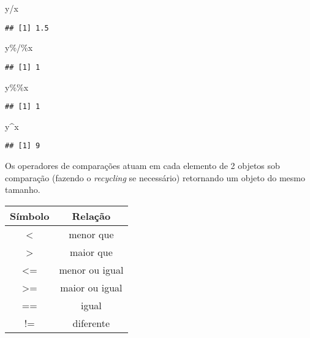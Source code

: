 \documentclass[
]{book}
\newenvironment{Shaded}{\begin{snugshade}}{\end{snugshade}}
\newcommand{\NormalTok}[1]{#1}
\newcommand{\SpecialCharTok}[1]{\textcolor[rgb]{0.00,0.00,0.00}{#1}}
\begin{document}
\begin{Shaded}
\begin{Highlighting}[]
\NormalTok{y}\SpecialCharTok{/}\NormalTok{x}
\end{Highlighting}
\end{Shaded}

\begin{verbatim}
## [1] 1.5
\end{verbatim}

\begin{Shaded}
\begin{Highlighting}[]
\NormalTok{y}\SpecialCharTok{\%/\%}\NormalTok{x}
\end{Highlighting}
\end{Shaded}

\begin{verbatim}
## [1] 1
\end{verbatim}

\begin{Shaded}
\begin{Highlighting}[]
\NormalTok{y}\SpecialCharTok{\%\%}\NormalTok{x}
\end{Highlighting}
\end{Shaded}

\begin{verbatim}
## [1] 1
\end{verbatim}

\begin{Shaded}
\begin{Highlighting}[]
\NormalTok{y}\SpecialCharTok{\^{}}\NormalTok{x}
\end{Highlighting}
\end{Shaded}

\begin{verbatim}
## [1] 9
\end{verbatim}

Os operadores de comparações atuam em cada elemento de 2 objetos sob comparação (fazendo o \emph{recycling} se necessário) retornando um objeto do mesmo tamanho.

\begin{longtable}[]{@{}cc@{}}
\toprule
Símbolo & Relação \\
\midrule
\endhead
\textless{} & menor que \\
\textgreater{} & maior que \\
\textless= & menor ou igual \\
\textgreater= & maior ou igual \\
== & igual \\
!= & diferente \\
\bottomrule
\end{longtable}
\end{document}
